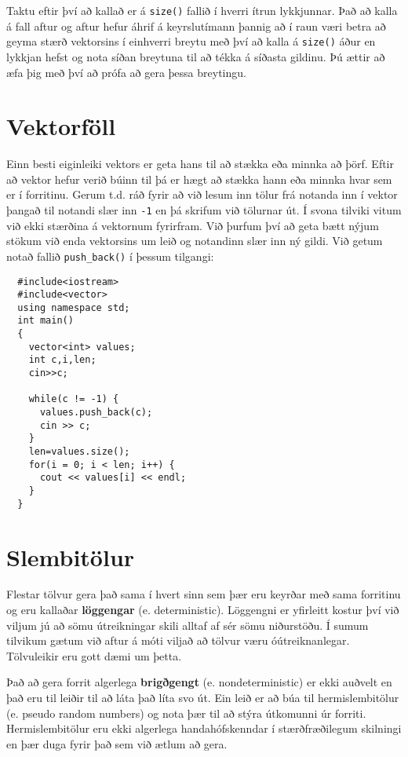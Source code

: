 Taktu eftir því að kallað er á {\tt size()} fallið í hverri ítrun lykkjunnar.
Það að kalla á fall aftur og aftur hefur áhrif á keyrslutímann þannig að í raun væri betra að geyma stærð vektorsins í einhverri breytu með því að kalla á 
{\tt size()} áður en lykkjan hefst og nota síðan breytuna til að tékka á síðasta gildinu.
Þú ættir að æfa þig með því að prófa að gera þessa breytingu.

\section{Vektorföll}

Einn besti eiginleiki vektors er geta hans til að stækka eða minnka að þörf.
Eftir að vektor hefur verið búinn til þá er hægt að stækka hann eða minnka hvar sem er í forritinu.
Gerum t.d. ráð fyrir að við lesum inn tölur frá notanda inn í vektor þangað til notandi slær inn {\tt -1} en þá skrifum við tölurnar út.
Í svona tilviki vitum við ekki stærðina á vektornum fyrirfram.
Við þurfum því að geta bætt nýjum stökum við enda vektorsins um leið og notandinn slær inn ný gildi.
Við getum notað fallið {\tt push\_back()} í þessum tilgangi:

\begin{verbatim}
  #include<iostream>
  #include<vector>
  using namespace std;
  int main()
  {
    vector<int> values;
    int c,i,len;
    cin>>c;
    
    while(c != -1) {
      values.push_back(c);
      cin >> c;
    }
    len=values.size();
    for(i = 0; i < len; i++) {
      cout << values[i] << endl;
    }
  }

\end{verbatim}

\section{Slembitölur}
\label{random}
\label{pseudorandom}

Flestar tölvur gera það sama í hvert sinn sem þær eru keyrðar með sama forritinu og eru kallaðar {\bf löggengar} (e. deterministic). 
Löggengni er yfirleitt kostur því við viljum jú að sömu útreikningar skili alltaf af sér sömu niðurstöðu.
Í sumum tilvikum gætum við aftur á móti viljað að tölvur væru óútreiknanlegar.  Tölvuleikir eru gott dæmi um þetta.

Það að gera forrit algerlega {\bf brigðgengt} (e. nondeterministic) er ekki auðvelt en það eru til leiðir til að láta það líta svo út.
Ein leið er að búa til hermislembitölur (e. pseudo random numbers) og nota þær til að stýra útkomunni úr forriti.
Hermislembitölur eru ekki algerlega handahófskenndar í stærðfræðilegum skilningi en þær duga fyrir það sem við ætlum að gera.

